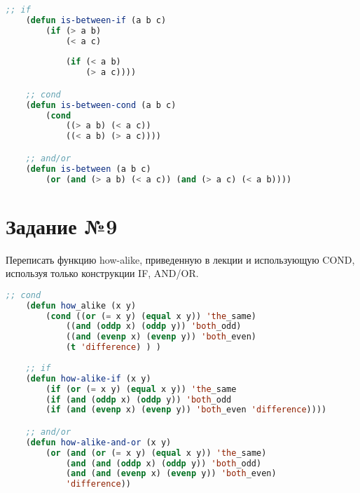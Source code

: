 \begin{lstlisting}[language=Lisp]
	;; if
	(defun is-between-if (a b c)
		(if (> a b)
			(< a c)
			
			(if (< a b)
				(> a c))))

	;; cond
	(defun is-between-cond (a b c)
		(cond
			((> a b) (< a c))
			((< a b) (> a c))))

	;; and/or
	(defun is-between (a b c)
		(or (and (> a b) (< a c)) (and (> a c) (< a b))))
\end{lstlisting}

\section{Задание №9}

Переписать функцию how-alike, приведенную в лекции и использующую COND, используя только конструкции IF, AND/OR.

\begin{lstlisting}[language=Lisp]
	;; cond
	(defun how_alike (x y)
		(cond ((or (= x y) (equal x y)) 'the_same)
			((and (oddp x) (oddp y)) 'both_odd)
			((and (evenp x) (evenp y)) 'both_even)
			(t 'difference) ) )
	
	;; if
	(defun how-alike-if (x y)
		(if (or (= x y) (equal x y)) 'the_same
		(if (and (oddp x) (oddp y)) 'both_odd
		(if (and (evenp x) (evenp y)) 'both_even 'difference))))

	;; and/or
	(defun how-alike-and-or (x y)
		(or (and (or (= x y) (equal x y)) 'the_same)
			(and (and (oddp x) (oddp y)) 'both_odd)
			(and (and (evenp x) (evenp y)) 'both_even)
			'difference))
\end{lstlisting}
